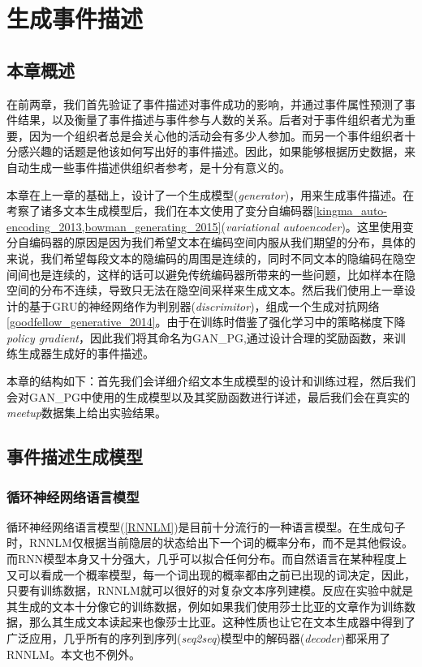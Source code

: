 \documentclass[]{template}
\begin{document}
\section{生成事件描述}
\subsection{本章概述}
在前两章，我们首先验证了事件描述对事件成功的影响，并通过事件属性预测了事件结果，以及衡量了事件描述与事件参与人数的关系。后者对于事件组织者尤为重要，因为一个组织者总是会关心他的活动会有多少人参加。而另一个事件组织者十分感兴趣的话题是他该如何写出好的事件描述。因此，如果能够根据历史数据，来自动生成一些事件描述供组织者参考，是十分有意义的。

本章在上一章的基础上，设计了一个生成模型(\textit{generator})，用来生成事件描述。在考察了诸多文本生成模型后，我们在本文使用了变分自编码器\ref{kingma_auto-encoding_2013,bowman_generating_2015}(\textit{variational autoencoder})。这里使用变分自编码器的原因是因为我们希望文本在编码空间内服从我们期望的分布，具体的来说，我们希望每段文本的隐编码的周围是连续的，同时不同文本的隐编码在隐空间间也是连续的，这样的话可以避免传统编码器所带来的一些问题，比如样本在隐空间的分布不连续，导致只无法在隐空间采样来生成文本。然后我们使用上一章设计的基于GRU的神经网络作为判别器(\textit{discrimitor})，组成一个生成对抗网络\ref{goodfellow_generative_2014}。由于在训练时借鉴了强化学习中的策略梯度下降\textit{policy gradient}，因此我们将其命名为GAN\_PG,通过设计合理的奖励函数，来训练生成器生成好的事件描述。

本章的结构如下：首先我们会详细介绍文本生成模型的设计和训练过程，然后我们会对GAN\_PG中使用的生成模型以及其奖励函数进行详述，最后我们会在真实的\textit{meetup}数据集上给出实验结果。

\subsection{事件描述生成模型}
\subsubsection{循环神经网络语言模型}
循环神经网络语言模型(\ref{RNNLM})是目前十分流行的一种语言模型。在生成句子时，RNNLM仅根据当前隐层的状态给出下一个词的概率分布，而不是其他假设。而RNN模型本身又十分强大，几乎可以拟合任何分布。而自然语言在某种程度上又可以看成一个概率模型，每一个词出现的概率都由之前已出现的词决定，因此，只要有训练数据，RNNLM就可以很好的对复杂文本序列建模。反应在实验中就是其生成的文本十分像它的训练数据，例如如果我们使用莎士比亚的文章作为训练数据，那么其生成文本读起来也像莎士比亚。这种性质也让它在文本生成器中得到了广泛应用，几乎所有的序列到序列(\textit{seq2seq})模型中的解码器(\textit{decoder})都采用了RNNLM。本文也不例外。
\end{document}
